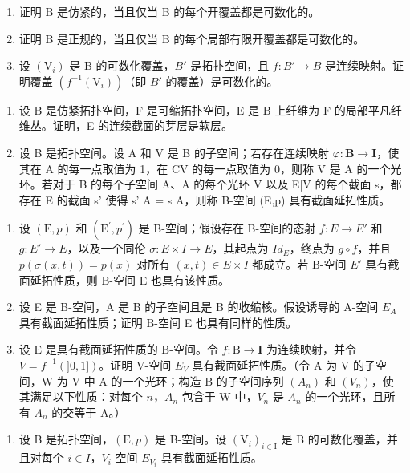\begin{enumerate}
\def\labelenumi{\alph{enumi})}
\item
  证明 B 是仿紧的，当且仅当 B 的每个开覆盖都是可数化的。
\item
  证明 B 是正规的，当且仅当 B 的每个局部有限开覆盖都是可数化的。
\item
  设 \((\mathrm{V}_{i})\) 是 B 的可数化覆盖，\(B'\) 是拓扑空间，且 \(f: B' \to B\) 是连续映射。证明覆盖 \((f^{-1}(\mathrm{V}_{i}))\)（即 \(B'\) 的覆盖）是可数化的。
\end{enumerate}

\begin{enumerate}
\def\labelenumi{\arabic{enumi})}
\setcounter{enumi}{29}
\item
  设 B 是仿紧拓扑空间，F 是可缩拓扑空间，E 是 B 上纤维为 F 的局部平凡纤维丛。证明，E 的连续截面的芽层是软层。
\item
  设 B 是拓扑空间。设 A 和 V 是 B 的子空间；若存在连续映射 \(\varphi\colon\mathbf{B}\to\mathbf{I}\)，使其在 A 的每一点取值为 1，在 CV 的每一点取值为 0，则称 V 是 A 的一个光环。若对于 B 的每个子空间 A、A 的每个光环 V 以及 E|V 的每个截面 s，都存在 E 的截面 s' 使得 s' \textbar{} A = s \textbar{} A，则称 B-空间 (E,p) 具有截面延拓性质。
\end{enumerate}

\begin{enumerate}
\def\labelenumi{\alph{enumi})}
\item
  设 \((\mathrm{E},p)\) 和 \((\mathrm{E}^{\prime},p^{\prime})\) 是 B-空间；假设存在 B-空间的态射 \(f: E \to E'\) 和 \(g: E' \to E\)，以及一个同伦 \(\sigma: E \times I \to E\)，其起点为 \(Id_{E}\)，终点为 \(g \circ f\)，并且 \(p(\sigma(x,t)) = p(x)\) 对所有 \((x,t) \in E \times I\) 都成立。若 B-空间 \(E'\) 具有截面延拓性质，则 B-空间 E 也具有该性质。
\item
  设 E 是 B-空间，A 是 B 的子空间且是 B 的收缩核。假设诱导的 A-空间 \(E_{A}\) 具有截面延拓性质；证明 B-空间 E 也具有同样的性质。
\item
 设 E 是具有截面延拓性质的 B-空间。令 \(f \colon \mathrm{B} \to \mathbf{I}\) 为连续映射，并令 \(V = f^{-1}(]0,1])\)。证明 V-空间 \(E_V\) 具有截面延拓性质。（令 A 为 V 的子空间，W 为 V 中 A 的一个光环；构造 B 的子空间序列 \((A_n)\) 和 \((V_n)\)，使其满足以下性质：对每个 \(n\)，\(A_n\) 包含于 W 中，\(V_n\) 是 \(A_n\) 的一个光环，且所有 \(A_n\) 的交等于 A。）
\end{enumerate}

\begin{enumerate}
\def\labelenumi{\arabic{enumi})}
\setcounter{enumi}{31}
\tightlist
\item
  设 B 是拓扑空间，\((\mathrm{E},p)\) 是 B-空间。设 \((\mathrm{V}_{i})_{i\in\mathrm{I}}\) 是 B 的可数化覆盖，并且对每个 \(i\in I\)，\(V_{i}\)-空间 \(E_{V_{i}}\) 具有截面延拓性质。
\end{enumerate}

